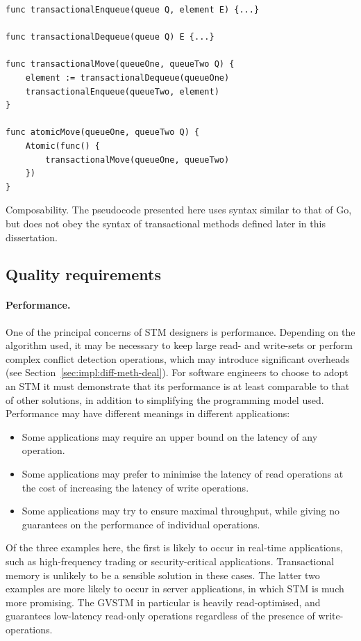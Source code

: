 \documentclass[12pt,a4paper,oneside,openright]{report}
\newcommand{\mycaption}[2]{\caption[#1]{#1 #2}}
\begin{document}
\begin{Listing}[hbtp]
\begin{lstlisting}
func transactionalEnqueue(queue Q, element E) {...}

func transactionalDequeue(queue Q) E {...}

func transactionalMove(queueOne, queueTwo Q) {
    element := transactionalDequeue(queueOne)
    transactionalEnqueue(queueTwo, element)
}

func atomicMove(queueOne, queueTwo Q) {
    Atomic(func() {
        transactionalMove(queueOne, queueTwo)
    })
}
\end{lstlisting}

  \mycaption{Composability.}{The pseudocode presented here uses syntax
    similar to that of Go, but does not obey the syntax of
    transactional methods defined later in this dissertation.}
  \label{lst:composability}
\end{Listing}


\subsection{Quality requirements}
\label{sec:prep:usab-requ}

\paragraph{Performance.} One of the principal concerns of STM
designers is performance. Depending on the algorithm used, it may be
necessary to keep large read- and write-sets or perform complex
conflict detection operations, which may introduce significant
overheads (see Section~\ref{sec:impl:diff-meth-deal}). For software
engineers to choose to adopt an STM it must demonstrate that its
performance is at least comparable to that of other solutions, in
addition to simplifying the programming model used. Performance may
have different meanings in different applications:
\begin{itemize}
\item Some applications may require an upper bound on the latency of
  any operation.
\item Some applications may prefer to minimise the latency of read
  operations at the cost of increasing the latency of write
  operations.
\item Some applications may try to ensure maximal throughput, while
  giving no guarantees on the performance of individual operations.
\end{itemize}
Of the three examples here, the first is likely to occur in real-time
applications, such as high-frequency trading or security-critical
applications. Transactional memory is unlikely to be a sensible
solution in these cases. The latter two examples are more likely to
occur in server applications, in which STM is much more promising. The
GVSTM in particular is heavily read-optimised, and guarantees
low-latency read-only operations regardless of the presence of
write-operations.
\end{document}
